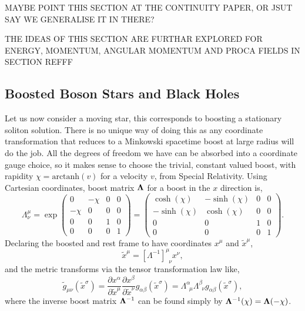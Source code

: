 MAYBE POINT THIS SECTION AT THE CONTINUITY PAPER, OR JSUT SAY WE GENERALISE IT IN THERE?

THE IDEAS OF THIS SECTION ARE FURTHAR EXPLORED FOR ENERGY, MOMENTUM, ANGULAR MOMENTUM AND PROCA FIELDS IN SECTION REFFF

\subsection{Boosted Boson Stars and Black Holes}
Let us now consider a moving star, this corresponds to boosting a stationary soliton solution. There is no unique way of doing this as any coordinate transformation that reduces to a Minkowski spacetime boost at large radius will do the job. All the degrees of freedom we have can be absorbed into a coordinate gauge choice, so it makes sense to choose the trivial, constant valued boost, with rapidity $\chi = \mathrm{arctanh} (v)$ for a velocity $v$, from Special Relativity. Using Cartesian coordinates, boost matrix $\boldsymbol{\Lambda}$ for a boost in the $x$ direction is,
\begin{equation}
\Lambda_\nu^\mu =  \exp\begin{pmatrix} 0 & -\chi & 0& 0 \\ -\chi & 0 & 0 & 0\\ 0 & 0&1&0 \\ 0&0&0&1\end{pmatrix} = \begin{pmatrix} \cosh(\chi) & -\sinh(\chi) & 0& 0 \\ -\sinh(\chi) & \cosh(\chi) & 0 & 0\\ 0 & 0&1&0 \\ 0&0&0&1\end{pmatrix}.
\end{equation}
Declaring the boosted and rest frame to have coordinates $x^\mu$ and $\tilde{x}^\mu$, 
\begin{equation}
\tilde{x}^\mu = [\Lambda^{-1}]^{\mu}_{\,\,\,\nu}x^{\nu},
\end{equation}
and the metric transforms via the tensor transformation law like,
\begin{equation}
\tilde{g}_{\mu\nu}(\tilde{x}^\sigma)= \frac{\partial x^\alpha}{\partial \tilde{x}^\mu}  \frac{\partial x^\beta}{\partial \tilde{x}^\nu}g_{\alpha\beta}(\tilde{x}^\sigma) = \Lambda^\alpha_{\,\,\,\mu}\Lambda^\beta_{\,\,\,\nu} g_{\alpha\beta}(\tilde{x}^\sigma),
\end{equation}
where the inverse boost matrix $\boldsymbol{\Lambda}^{-1}$ can be found simply by $\boldsymbol{\Lambda}^{-1}(\chi) = \boldsymbol{\Lambda}(-\chi)$.
